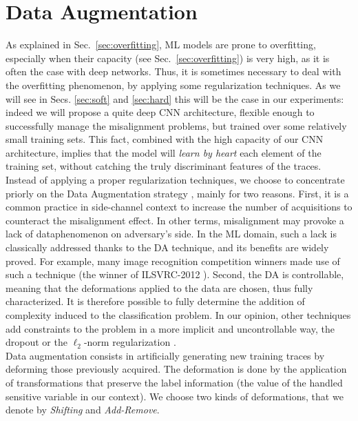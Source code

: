 \section{Data Augmentation}\label{sec:DA}
As explained in Sec.~\ref{sec:overfitting}, ML models are prone to overfitting, especially when their capacity (see Sec.~\ref{sec:overfitting}) is very high, as it is often the case with deep networks. Thus, it is sometimes necessary to deal with the overfitting phenomenon, by applying some regularization techniques. As we will see in Secs. \ref{sec:soft} and \ref{sec:hard} this will be the case in our experiments: indeed we will propose a quite deep CNN architecture,  flexible enough to successfully manage the misalignment problems, but trained over some relatively small training sets. This fact, combined with the high capacity of our CNN architecture, implies that the model will \emph{learn by heart} each element of the training set, without catching the truly discriminant features of the traces.\\

Instead of applying a proper regularization techniques, we choose to concentrate priorly on the Data Augmentation strategy \cite{simard2003best}, mainly for two reasons. First, it is a common practice in side-channel context to increase the number of acquisitions to counteract the misalignment effect. In other terms, misalignment may provoke a \textquotedbl lack of data\textquotedbl phenomenon on adversary's side. In the ML domain, such a lack is classically addressed thanks to the DA technique, and its benefits are widely proved. For example, many image recognition competition winners made use of such a technique (\eg the winner of ILSVRC-2012 \cite{KSH12}). Second, the DA is controllable, meaning that the deformations applied to the data are chosen, thus fully characterized. It is therefore possible to fully determine the addition of complexity induced to the classification problem. In our opinion, other techniques add constraints to the problem in a more implicit and uncontrollable way, \eg the dropout \cite{HSKSS12}  or the $\ell_2$-norm regularization \cite{christopher2006pattern}.\\

Data augmentation consists in artificially generating new training traces by deforming those previously acquired. The deformation is done by the application of transformations that preserve the  label information (\ie the value of the handled sensitive variable in our context). We choose two kinds of deformations, that we denote by \emph{Shifting} and \emph{Add-Remove}. 

